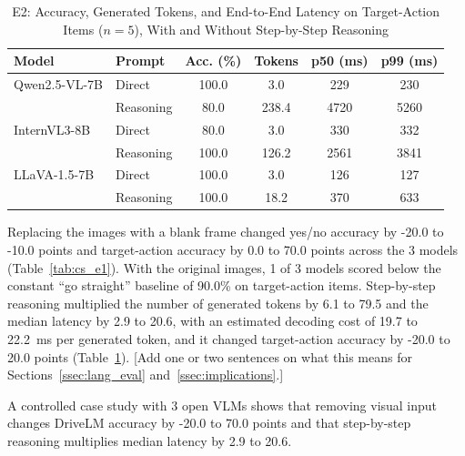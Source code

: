 \begin{table}[t]
\centering
\caption{E2: Accuracy, Generated Tokens, and End-to-End Latency on Target-Action Items ($n=5$), With and Without Step-by-Step Reasoning}
\label{tab:cs_e2}
\scriptsize
\renewcommand{\arraystretch}{1.12}
\begin{tabular}{@{}l l c c c c@{}}
\toprule
\textbf{Model} & \textbf{Prompt} & \textbf{Acc. (\%)} & \textbf{Tokens} & \textbf{p50 (ms)} & \textbf{p99 (ms)} \\
\midrule
Qwen2.5-VL-7B & Direct & 100.0 & 3.0 & 229 & 230 \\
 & Reasoning & 80.0 & 238.4 & 4720 & 5260 \\
InternVL3-8B & Direct & 80.0 & 3.0 & 330 & 332 \\
 & Reasoning & 100.0 & 126.2 & 2561 & 3841 \\
LLaVA-1.5-7B & Direct & 100.0 & 3.0 & 126 & 127 \\
 & Reasoning & 100.0 & 18.2 & 370 & 633 \\
\bottomrule
\end{tabular}
\end{table}

Replacing the images with a blank frame changed yes/no accuracy by -20.0 to -10.0 points and target-action accuracy by 0.0 to 70.0 points across the 3 models (Table~\ref{tab:cs_e1}). With the original images, 1 of 3 models scored below the constant ``go straight'' baseline of 90.0\% on target-action items. Step-by-step reasoning multiplied the number of generated tokens by 6.1 to 79.5 and the median latency by 2.9 to 20.6, with an estimated decoding cost of 19.7 to 22.2~ms per generated token, and it changed target-action accuracy by -20.0 to 20.0 points (Table~\ref{tab:cs_e2}). [Add one or two sentences on what this means for Sections~\ref{ssec:lang_eval} and~\ref{ssec:implications}.]

A controlled case study with 3 open VLMs shows that removing visual input changes DriveLM accuracy by -20.0 to 70.0 points and that step-by-step reasoning multiplies median latency by 2.9 to 20.6.
